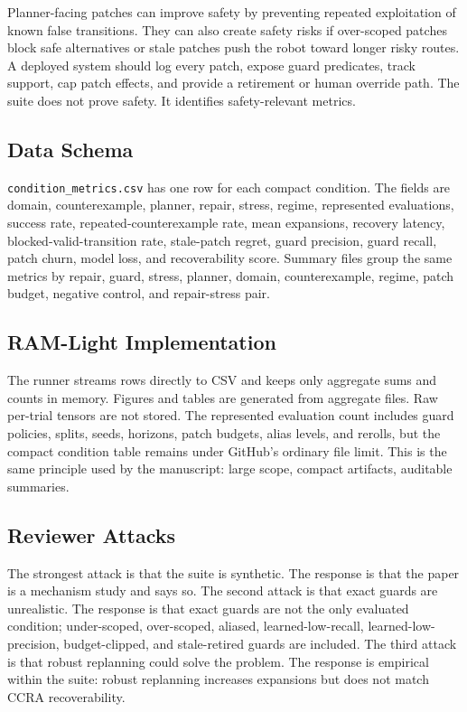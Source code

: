 \documentclass{article}
\newcommand{\ccra}{\textsc{CCRA}}
\begin{document}
Planner-facing patches can improve safety by preventing repeated exploitation
of known false transitions. They can also create safety risks if over-scoped
patches block safe alternatives or stale patches push the robot toward longer
risky routes. A deployed system should log every patch, expose guard predicates,
track support, cap patch effects, and provide a retirement or human override
path. The suite does not prove safety. It identifies safety-relevant metrics.

\subsection{Data Schema}

\texttt{condition\_metrics.csv} has one row for each compact condition. The
fields are domain, counterexample, planner, repair, stress, regime,
represented evaluations, success rate, repeated-counterexample rate, mean
expansions, recovery latency, blocked-valid-transition rate, stale-patch regret,
guard precision, guard recall, patch churn, model loss, and recoverability
score. Summary files group the same metrics by repair, guard, stress, planner,
domain, counterexample, regime, patch budget, negative control, and
repair-stress pair.

\subsection{RAM-Light Implementation}

The runner streams rows directly to CSV and keeps only aggregate sums and
counts in memory. Figures and tables are generated from aggregate files. Raw
per-trial tensors are not stored. The represented evaluation count includes
guard policies, splits, seeds, horizons, patch budgets, alias levels, and
rerolls, but the compact condition table remains under GitHub's ordinary file
limit. This is the same principle used by the manuscript: large scope, compact
artifacts, auditable summaries.

\subsection{Reviewer Attacks}

The strongest attack is that the suite is synthetic. The response is that the
paper is a mechanism study and says so. The second attack is that exact guards
are unrealistic. The response is that exact guards are not the only evaluated
condition; under-scoped, over-scoped, aliased, learned-low-recall,
learned-low-precision, budget-clipped, and stale-retired guards are included.
The third attack is that robust replanning could solve the problem. The response
is empirical within the suite: robust replanning increases expansions but does
not match \ccra{} recoverability.
\end{document}
